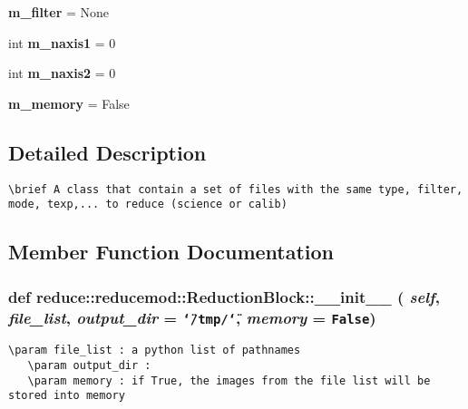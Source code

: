 \begin{CompactItemize}
\item 
\textbf{m\_\-filter} = None\label{classreduce_1_1reducemod_1_1ReductionBlock_814114705a81132a5a0930d7e66c80f0}

\item 
int \textbf{m\_\-naxis1} = 0\label{classreduce_1_1reducemod_1_1ReductionBlock_ea68eefa3733fb8a412899c67d981b82}

\item 
int \textbf{m\_\-naxis2} = 0\label{classreduce_1_1reducemod_1_1ReductionBlock_f94fa3364600476fe0463e60e9da879f}

\item 
\textbf{m\_\-memory} = False\label{classreduce_1_1reducemod_1_1ReductionBlock_c592dfa09d60506ec9b6d4afbb9fac77}

\end{CompactItemize}


\subsection{Detailed Description}


\footnotesize\begin{verbatim}
\brief A class that contain a set of files with the same type, filter, mode, texp,... to reduce (science or calib)
\end{verbatim}
\normalsize
 



\subsection{Member Function Documentation}
\subsubsection{\setlength{\rightskip}{0pt plus 5cm}def reduce::reducemod::Reduction\-Block::\_\-\_\-init\_\-\_\- ( {\em self},  {\em file\_\-list},  {\em output\_\-dir} = {\tt \char`\"{}/tmp/\char`\"{}},  {\em memory} = {\tt False})}\label{classreduce_1_1reducemod_1_1ReductionBlock_6f64e1fd3151d34a57f1c4138c8a7c9d}




\footnotesize\begin{verbatim}\param file_list : a python list of pathnames
   \param output_dir :
   \param memory : if True, the images from the file list will be stored into memory 
\end{verbatim}
\normalsize
